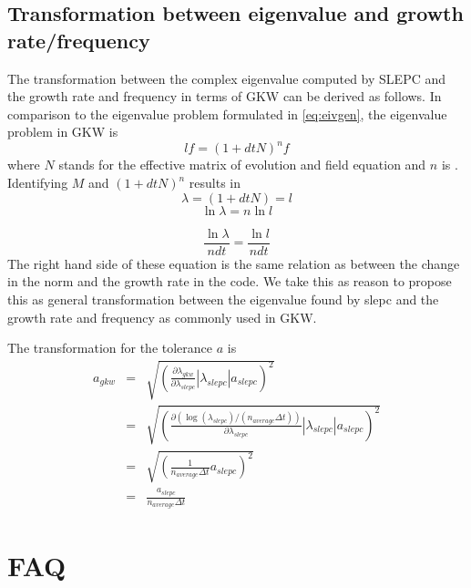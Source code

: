 \subsection{Transformation between eigenvalue and growth rate/frequency}
\label{subsec:eivtrafoeivgf}
The transformation between the complex eigenvalue computed by SLEPC and the growth
rate and frequency in terms of GKW can be derived as follows.
In comparison to the eigenvalue problem formulated in \eqref{eq:eivgen}, 
the eigenvalue problem in GKW is
\begin{equation}
  l f =  (1 + dt N)^n f
\end{equation}
where $N$ stands for the effective matrix of evolution and field equation and $n$ is .
Identifying $M$ and $(1 + dt N)^n$ results in
\begin{equation}
  \lambda = (1 + dt N) = l
\end{equation}
\begin{equation}
  \ln \lambda = n \ln l
\end{equation}

\begin{equation}
  \frac{\ln \lambda}{n dt} = \frac{\ln l}{n dt}
\end{equation}
The right hand side of these equation is the same relation as between the
change in the norm and the growth rate in the code. We take this as reason to
propose this as general transformation between the eigenvalue found by slepc and
the growth rate and frequency as commonly used in GKW.

\newcommand{\pder}[2]{\frac{\partial#1}{\partial#2}}
The transformation for the tolerance $a$ is
\begin{align}
	a_{gkw} & = & \sqrt{\left( \pder{\lambda_{gkw}}{\lambda_{slepc}} |\lambda_{slepc}|a_{slepc}\right)^2} \\
	& = & \sqrt{\left( \pder{(\log(\lambda_{slepc})/(n_{average} \Delta t))}{\lambda_{slepc}} |\lambda_{slepc}|a_{slepc}\right)^2} \\
	& = & \sqrt{\left( \frac{1}{n_{average} \Delta t} a_{slepc}\right)^2} \\
	& = & \frac{a_{slepc}}{n_{average} \Delta t}
\end{align}



\section{\label{sec:eivfaq}FAQ}

